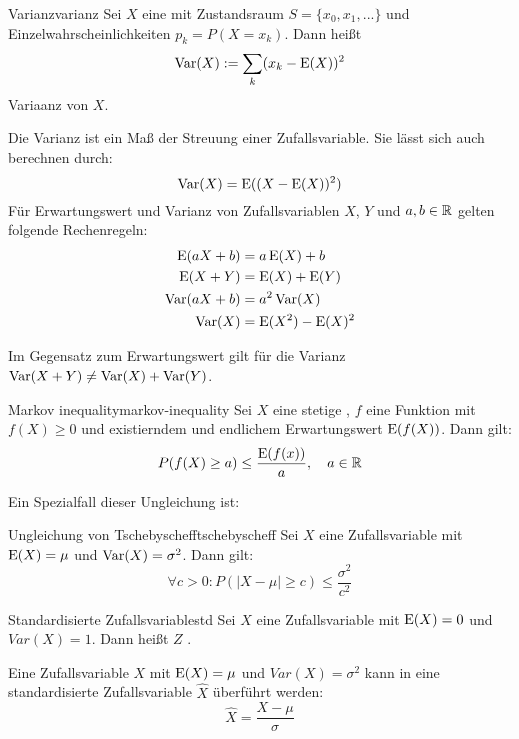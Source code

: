 \begin{definition}{Varianz}{varianz}
Sei $X$ eine  mit Zustandsraum $S=\{x_0, x_1,
...\}$ und Einzelwahrscheinlichkeiten $p_k=P(X=x_k)$. Dann heißt
\[
\operatorname{Var}(X) := \sum_k (x_k - \operatorname{E}(X))^2
\]
Variaanz von $X$.
\end{definition}

Die Varianz ist ein Maß der Streuung einer Zufallsvariable. Sie lässt sich auch
berechnen durch:
\[
\operatorname{Var}(X) = \operatorname{E}((X-\operatorname{E}(X))^2)
\]
Für Erwartungswert und Varianz von Zufallsvariablen $X$, $Y$ und $a,b\in\mathbb{R}$ gelten
folgende Rechenregeln:
\begin{align*}
\operatorname{E}(aX+b) &= a\operatorname{E}(X) + b \\
\operatorname{E}(X+Y) &= \operatorname{E}(X) + \operatorname{E}(Y) \\
\operatorname{Var}(aX+b) &= a^2 \operatorname{Var}(X) \\
\operatorname{Var}(X) &= \operatorname{E}(X^2) - \operatorname{E}(X)^2
\end{align*}

Im Gegensatz zum Erwartungswert gilt für die Varianz $\operatorname{Var}(X+Y) \ne \operatorname{Var}(X) +
\operatorname{Var}(Y)$.

\begin{theorem}{Markov inequality}{markov-inequality}
Sei $X$ eine stetige , $f$ eine Funktion mit
$f(X)\ge 0$ und existierndem und endlichem Erwartungswert $\operatorname{E}(f(X))$. Dann gilt:
\[
P(f(X)\ge a)\le \frac{\operatorname{E}(f(x))}{a},\quad a\in\mathbb{R}
\]
\end{theorem}
Ein Spezialfall dieser Ungleichung ist:
\begin{theorem}{Ungleichung von Tschebyscheff}{tschebyscheff}
Sei $X$ eine Zufallsvariable mit $\operatorname{E}(X) = \mu$ und $\operatorname{Var}(X) = \sigma^2$. Dann
gilt:
\[
\forall c>0: P(|X-\mu|\ge c) \le\frac{\sigma^2}{c^2}
\]
\end{theorem}

\begin{definition}{Standardisierte Zufallsvariable}{std}
Sei $X$ eine Zufallsvariable mit $\operatorname{E}(X) = 0$ und $Var(X) = 1$. Dann heißt $Z$
.
\end{definition}

Eine Zufallsvariable $X$ mit $\operatorname{E}(X) = \mu$ und $Var(X)=\sigma^2$ kann in eine
standardisierte Zufallsvariable $\hat{X}$ überführt werden:
\[
\hat{X} = \frac{X-\mu}{\sigma}
\]
